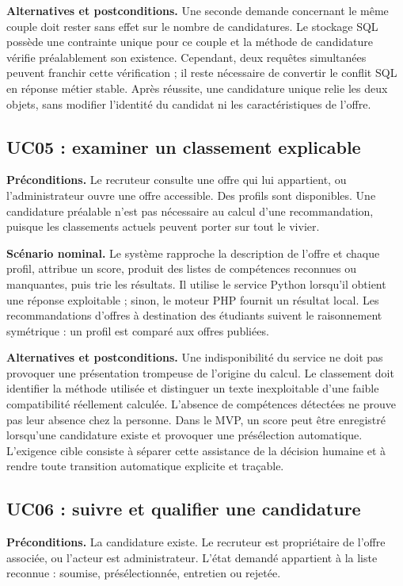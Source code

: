 \textbf{Alternatives et postconditions.} Une seconde demande concernant le même couple doit rester sans effet sur le nombre de candidatures. Le stockage SQL possède une contrainte unique pour ce couple et la méthode de candidature vérifie préalablement son existence. Cependant, deux requêtes simultanées peuvent franchir cette vérification ; il reste nécessaire de convertir le conflit SQL en réponse métier stable. Après réussite, une candidature unique relie les deux objets, sans modifier l'identité du candidat ni les caractéristiques de l'offre.

\subsection{UC05 : examiner un classement explicable}

\textbf{Préconditions.} Le recruteur consulte une offre qui lui appartient, ou l'administrateur ouvre une offre accessible. Des profils sont disponibles. Une candidature préalable n'est pas nécessaire au calcul d'une recommandation, puisque les classements actuels peuvent porter sur tout le vivier.

\textbf{Scénario nominal.} Le système rapproche la description de l'offre et chaque profil, attribue un score, produit des listes de compétences reconnues ou manquantes, puis trie les résultats. Il utilise le service Python lorsqu'il obtient une réponse exploitable ; sinon, le moteur PHP fournit un résultat local. Les recommandations d'offres à destination des étudiants suivent le raisonnement symétrique : un profil est comparé aux offres publiées.

\textbf{Alternatives et postconditions.} Une indisponibilité du service ne doit pas provoquer une présentation trompeuse de l'origine du calcul. Le classement doit identifier la méthode utilisée et distinguer un texte inexploitable d'une faible compatibilité réellement calculée. L'absence de compétences détectées ne prouve pas leur absence chez la personne. Dans le MVP, un score peut être enregistré lorsqu'une candidature existe et provoquer une présélection automatique. L'exigence cible consiste à séparer cette assistance de la décision humaine et à rendre toute transition automatique explicite et traçable.

\subsection{UC06 : suivre et qualifier une candidature}

\textbf{Préconditions.} La candidature existe. Le recruteur est propriétaire de l'offre associée, ou l'acteur est administrateur. L'état demandé appartient à la liste reconnue : soumise, présélectionnée, entretien ou rejetée.

